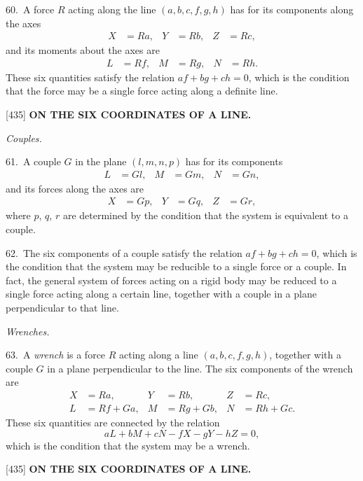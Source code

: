 \documentclass[12pt,a4paper]{article}
\newcommand{\paperref}[1]{\textup{[#1]}}
\theoremstyle{definition}
\begin{document}
60.~A force $R$ acting along the line $(a, b, c, f, g, h)$ has for its components along the axes
\begin{align*}
X &= R a, & Y &= R b, & Z &= R c,
\end{align*}
and its moments about the axes are
\begin{align*}
L &= R f, & M &= R g, & N &= R h.
\end{align*}
These six quantities satisfy the relation $a f + b g + c h = 0$, which is the condition that the force may be a single force acting along a definite line.

\newpage
\setcounter{page}{89}

\noindent\paperref{435}\quad
\textbf{ON THE SIX COORDINATES OF A LINE.}

\textit{Couples.}

61.~A couple $G$ in the plane $(l, m, n, p)$ has for its components
\begin{align*}
L &= G l, & M &= G m, & N &= G n,
\end{align*}
and its forces along the axes are
\begin{align*}
X &= G p, & Y &= G q, & Z &= G r,
\end{align*}
where $p$, $q$, $r$ are determined by the condition that the system is equivalent to a couple.

62.~The six components of a couple satisfy the relation $a f + b g + c h = 0$, which is the condition that the system may be reducible to a single force or a couple. In fact, the general system of forces acting on a rigid body may be reduced to a single force acting along a certain line, together with a couple in a plane perpendicular to that line.

\textit{Wrenches.}

63.~A \textit{wrench} is a force $R$ acting along a line $(a, b, c, f, g, h)$, together with a couple $G$ in a plane perpendicular to the line. The six components of the wrench are
\begin{align*}
X &= R a, & Y &= R b, & Z &= R c,\\
L &= R f + G a, & M &= R g + G b, & N &= R h + G c.
\end{align*}
These six quantities are connected by the relation
\[
a L + b M + c N - f X - g Y - h Z = 0,
\]
which is the condition that the system may be a wrench.

\newpage
\setcounter{page}{90}

\noindent\paperref{435}\quad
\textbf{ON THE SIX COORDINATES OF A LINE.}
\end{document}
